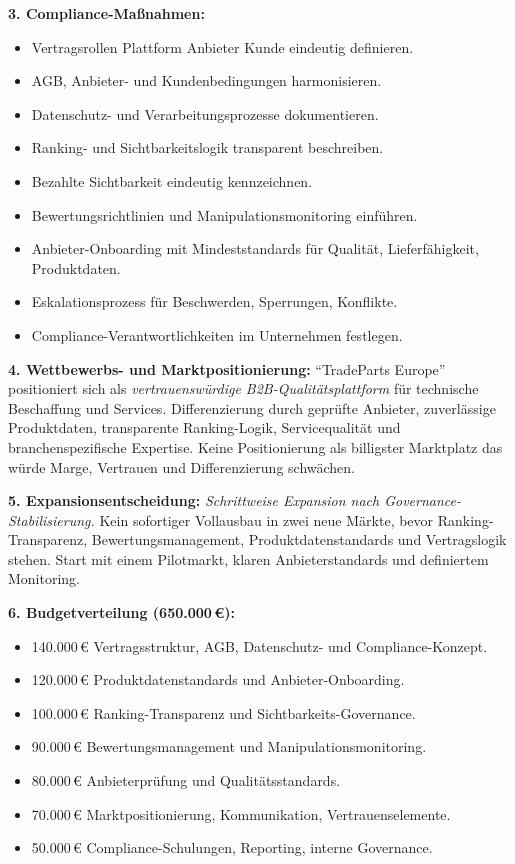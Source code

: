 \documentclass[11pt,a4paper,oneside]{article}
\begin{document}
\begin{loesungbox}
\textbf{3. Compliance-Maßnahmen:}
\begin{itemize}
  \item Vertragsrollen Plattform \textperiodcentered{} Anbieter \textperiodcentered{} Kunde eindeutig definieren.
  \item AGB, Anbieter- und Kundenbedingungen harmonisieren.
  \item Datenschutz- und Verarbeitungsprozesse dokumentieren.
  \item Ranking- und Sichtbarkeitslogik transparent beschreiben.
  \item Bezahlte Sichtbarkeit eindeutig kennzeichnen.
  \item Bewertungsrichtlinien und Manipulationsmonitoring einführen.
  \item Anbieter-Onboarding mit Mindeststandards für Qualität, Lieferfähigkeit, Produktdaten.
  \item Eskalationsprozess für Beschwerden, Sperrungen, Konflikte.
  \item Compliance-Verantwortlichkeiten im Unternehmen festlegen.
\end{itemize}

\textbf{4. Wettbewerbs- und Marktpositionierung:}
``TradeParts Europe'' positioniert sich als \emph{vertrauenswürdige B2B-Qualitätsplattform} für technische Beschaffung und Services. Differenzierung durch geprüfte Anbieter, zuverlässige Produktdaten, transparente Ranking-Logik, Servicequalität und branchenspezifische Expertise. Keine Positionierung als billigster Marktplatz \textendash{} das würde Marge, Vertrauen und Differenzierung schwächen.

\smallskip
\textbf{5. Expansionsentscheidung:}
\emph{Schrittweise Expansion nach Governance-Stabilisierung.} Kein sofortiger Vollausbau in zwei neue Märkte, bevor Ranking-Transparenz, Bewertungsmanagement, Produktdatenstandards und Vertragslogik stehen. Start mit einem Pilotmarkt, klaren Anbieterstandards und definiertem Monitoring.

\smallskip
\textbf{6. Budgetverteilung (650.000\,\euro):}
\begin{itemize}
  \item 140.000\,\euro{} \textendash{} Vertragsstruktur, AGB, Datenschutz- und Compliance-Konzept.
  \item 120.000\,\euro{} \textendash{} Produktdatenstandards und Anbieter-Onboarding.
  \item 100.000\,\euro{} \textendash{} Ranking-Transparenz und Sichtbarkeits-Governance.
  \item 90.000\,\euro{} \textendash{} Bewertungsmanagement und Manipulationsmonitoring.
  \item 80.000\,\euro{} \textendash{} Anbieterprüfung und Qualitätsstandards.
  \item 70.000\,\euro{} \textendash{} Marktpositionierung, Kommunikation, Vertrauenselemente.
  \item 50.000\,\euro{} \textendash{} Compliance-Schulungen, Reporting, interne Governance.
\end{itemize}


\end{loesungbox}
\end{document}
